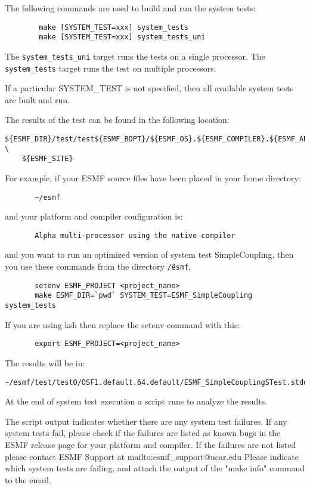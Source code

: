The following commands are used to build and run the system tests:

\begin{verbatim}
        make [SYSTEM_TEST=xxx] system_tests
        make [SYSTEM_TEST=xxx] system_tests_uni
\end{verbatim}

The {\tt system\_tests\_uni} target runs the tests on a single processor. 
The {\tt system\_tests} target runs the test on multiple processors.

If a particular SYSTEM\_TEST is not specified, then all available system tests 
are built and run.

The results of the test can be found in the following location:
\begin{verbatim}
${ESMF_DIR}/test/test${ESMF_BOPT}/${ESMF_OS}.${ESMF_COMPILER}.${ESMF_ABI}. \
	${ESMF_SITE}
\end{verbatim}

For example, if your ESMF source files have been placed in your home directory:
\begin{verbatim}
       ~/esmf
\end{verbatim}

and your platform and compiler configuration is:
\begin{verbatim}
       Alpha multi-processor using the native compiler
\end{verbatim}

and you want to run an optimized version of system test SimpleCoupling,
then you use these commands from the directory {\tt \~/esmf}. 
\begin{verbatim}
       setenv ESMF_PROJECT <project_name>
       make ESMF_DIR=`pwd` SYSTEM_TEST=ESMF_SimpleCoupling system_tests
\end{verbatim}

If you are using ksh then replace the setenv command with
this:

\begin{verbatim}
       export ESMF_PROJECT=<project_name>
\end{verbatim}

The results will be in:
\begin{verbatim}
~/esmf/test/testO/OSF1.default.64.default/ESMF_SimpleCouplingSTest.stdout
\end{verbatim}

At the end of system test execution a script runs to analyze the results.


The script output indicates whether there are any system test failures.
If any system tests fail, please check if the failures are listed as known bugs in the ESMF release
page 
for your platform and compiler.
If the failures are not listed please contact ESMF Support at 
{mailto:esmf\_support@ucar.edu}
Please indicate which system tests are failing, and attach the output of the "make info" command to the email.




